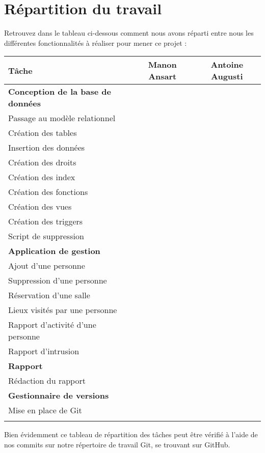\section{Répartition du travail}
Retrouvez dans le tableau ci-dessous comment nous avons réparti entre nous les différentes fonctionnalités à réaliser pour mener ce projet : 
\begin{center}
	\begin{tabular}
	{| l ||	c |	c |} \hline
		Tâche & Manon Ansart & Antoine Augusti \\ \hline \hline
		\textbf{Conception de la base de données} & & \\ \hline
		Passage au modèle relationnel & \checkmark & \checkmark \\ \hline
		Création des tables & & \checkmark \\ \hline
		Insertion des données & \checkmark &  \\ \hline
		Création des droits & \checkmark &  \\ \hline
		Création des index & & \checkmark \\ \hline
		Création des fonctions & \checkmark &  \\ \hline
		Création des vues & & \checkmark \\ \hline
		Création des triggers & & \checkmark \\ \hline
		Script de suppression & \checkmark &  \\ \hline
		\hlineGras 
		\textbf{Application de gestion} & & \\ \hline
		Ajout d'une personne & \checkmark &  \\ \hline
		Suppression d'une personne & \checkmark &  \\ \hline
		Réservation d'une salle & & \checkmark \\ \hline
		Lieux visités par une personne & \checkmark &  \\ \hline
		Rapport d'activité d'une personne & & \checkmark \\ \hline
		Rapport d'intrusion & & \checkmark \\ \hline
		\hlineGras 
		\textbf{Rapport} & & \\ \hline
		Rédaction du rapport & \checkmark & \checkmark \\ \hline
		\hlineGras 
		\textbf{Gestionnaire de versions} & & \\ \hline
		Mise en place de Git &  & \checkmark \\ \hline
		\hlineGras 
	\end{tabular}
\end{center}
Bien évidemment ce tableau de répartition des tâches peut être vérifié à l'aide de nos commits sur notre répertoire de travail Git, se trouvant sur GitHub.

